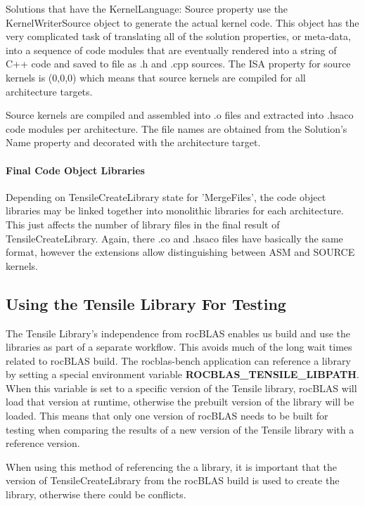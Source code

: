 \documentclass[]{article}
\begin{document}
Solutions that have the KernelLanguage: Source property use the KernelWriterSource object to generate the actual kernel code. This object has the very complicated task of translating all of the solution properties, or meta-data, into a sequence of code modules that are eventually rendered into a string of C++ code and saved to file as .h and .cpp sources. The ISA property for source kernels is (0,0,0) which means that source kernels are compiled for all architecture targets.

Source kernels are compiled and assembled into .o files and extracted into .hsaco code modules per architecture. The file names are obtained from the Solution's Name property and decorated with the architecture target.

\paragraph{Final Code Object Libraries}

Depending on TensileCreateLibrary state for 'MergeFiles', the code object libraries may be linked together into monolithic libraries for each architecture. This just affects the number of library files in the final result of TensileCreateLibrary. Again, there .co and .hsaco files have basically the same format, however the extensions allow distinguishing between ASM and SOURCE kernels.

\subsection{Using the Tensile Library For Testing}

The Tensile Library's independence from rocBLAS enables us build and use the libraries as part of a separate workflow. This avoids much of the long wait times related to rocBLAS build. The rocblas-bench application can reference a library by setting a special environment variable \textbf{ROCBLAS\_TENSILE\_LIBPATH}. When this variable is set to a specific version of the Tensile library, rocBLAS will load that version at runtime, otherwise the prebuilt version of the library will be loaded. This means that only one version of rocBLAS needs to be built for testing when comparing the results of a new version of the Tensile library with a reference version. 

When using this method of referencing the a library, it is important that the version of TensileCreateLibrary from the rocBLAS build is used to create the library, otherwise there could be conflicts.
\end{document}
